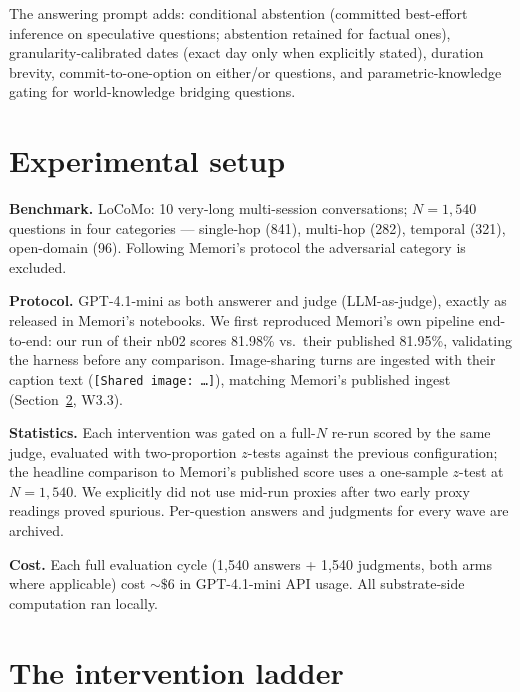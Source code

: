 \documentclass[11pt]{article}
\begin{document}
The answering prompt adds: conditional abstention (committed
best-effort inference on speculative questions; abstention retained
for factual ones), granularity-calibrated dates (exact day only when
explicitly stated), duration brevity, commit-to-one-option on
either/or questions, and parametric-knowledge gating for
world-knowledge bridging questions.

\section{Experimental setup}

\textbf{Benchmark.} LoCoMo: 10 very-long multi-session conversations;
$N{=}1{,}540$ questions in four categories --- single-hop (841),
multi-hop (282), temporal (321), open-domain (96). Following Memori's
protocol the adversarial category is excluded.

\textbf{Protocol.} GPT-4.1-mini as both answerer and judge
(LLM-as-judge), exactly as released in Memori's notebooks. We first
reproduced Memori's own pipeline end-to-end: our run of their nb02
scores 81.98\% vs.\ their published 81.95\%, validating the harness
before any comparison. Image-sharing turns are ingested with their
caption text (\texttt{[Shared image: \dots]}), matching Memori's
published ingest (Section~\ref{sec:ladder}, W3.3).

\textbf{Statistics.} Each intervention was gated on a full-$N$ re-run
scored by the same judge, evaluated with two-proportion $z$-tests
against the previous configuration; the headline comparison to
Memori's published score uses a one-sample $z$-test at $N{=}1{,}540$.
We explicitly did not use mid-run proxies after two early proxy
readings proved spurious. Per-question answers and judgments for every
wave are archived.

\textbf{Cost.} Each full evaluation cycle (1{,}540 answers + 1{,}540
judgments, both arms where applicable) cost ${\sim}\$6$ in
GPT-4.1-mini API usage. All substrate-side computation ran locally.

\section{The intervention ladder}
\label{sec:ladder}
\end{document}
